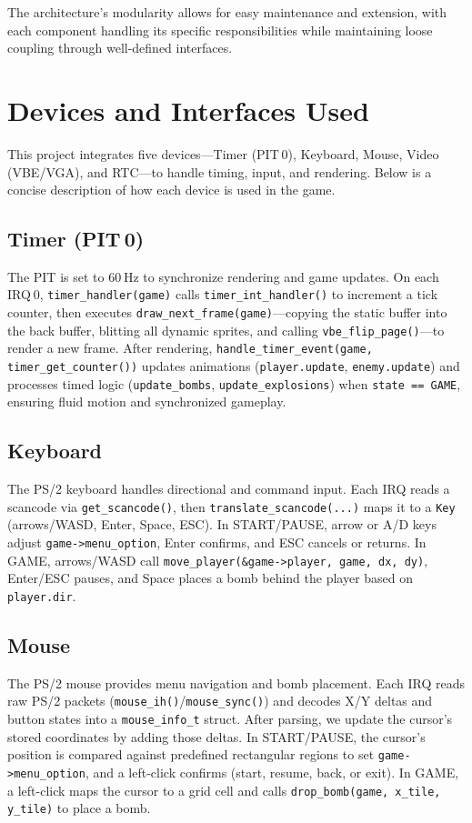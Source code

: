 \documentclass[12pt,a4paper]{article}
\begin{document}
The architecture's modularity allows for easy maintenance and extension, with each component handling its specific responsibilities while maintaining loose coupling through well-defined interfaces.

\section{Devices and Interfaces Used}
This project integrates five devices—Timer (PIT 0), Keyboard, Mouse, Video (VBE/VGA), and RTC—to handle timing, input, and rendering. Below is a concise description of how each device is used in the game.

\subsection*{Timer (PIT 0)}
The PIT is set to 60 Hz to synchronize rendering and game updates. On each IRQ 0, \texttt{timer\_handler(game)} calls \texttt{timer\_int\_handler()} to increment a tick counter, then executes \texttt{draw\_next\_frame(game)}—copying the static buffer into the back buffer, blitting all dynamic sprites, and calling \texttt{vbe\_flip\_page()}—to render a new frame. After rendering, \texttt{handle\_timer\_event(game, timer\_get\_counter())} updates animations (\texttt{player.update}, \texttt{enemy.update}) and processes timed logic (\texttt{update\_bombs}, \texttt{update\_explosions}) when \texttt{state == GAME}, ensuring fluid motion and synchronized gameplay.

\subsection*{Keyboard}
The PS/2 keyboard handles directional and command input. Each IRQ reads a scancode via \texttt{get\_scancode()}, then \texttt{translate\_scancode(...)} maps it to a \texttt{Key} (arrows/WASD, Enter, Space, ESC). In START/PAUSE, arrow or A/D keys adjust \texttt{game->menu\_option}, Enter confirms, and ESC cancels or returns. In GAME, arrows/WASD call \texttt{move\_player(\&game->player, game, dx, dy)}, Enter/ESC pauses, and Space places a bomb behind the player based on \texttt{player.dir}.

\subsection*{Mouse}
The PS/2 mouse provides menu navigation and bomb placement. Each IRQ reads raw PS/2 packets (\texttt{mouse\_ih()}/\texttt{mouse\_sync()}) and decodes X/Y deltas and button states into a \texttt{mouse\_info\_t} struct. After parsing, we update the cursor’s stored coordinates by adding those deltas. In START/PAUSE, the cursor’s position is compared against predefined rectangular regions to set \texttt{game->menu\_option}, and a left-click confirms (start, resume, back, or exit). In GAME, a left-click maps the cursor to a grid cell and calls \texttt{drop\_bomb(game, x\_tile, y\_tile)} to place a bomb.
\end{document}
